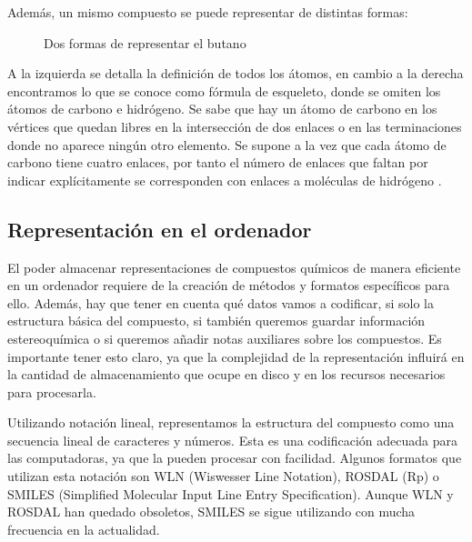 Además, un mismo compuesto se puede representar de distintas formas:
\begin{figure}[H]
\centering
    \caption{Dos formas de representar el butano} 
\end{figure}

A la izquierda se detalla la definición de todos los átomos, en cambio a la derecha encontramos lo que se conoce como fórmula de esqueleto, donde se omiten los átomos de carbono e hidrógeno. Se sabe que hay un átomo de carbono en los vértices que quedan libres en la intersección de dos enlaces o en las terminaciones donde no aparece ningún otro elemento. Se supone a la vez que cada átomo de carbono tiene cuatro enlaces, por tanto el número de enlaces que faltan por indicar explícitamente se corresponden con enlaces a moléculas de hidrógeno \cite{formestructural,structrep}.


\subsection{Representación en el ordenador}
El poder almacenar representaciones de compuestos químicos de manera eficiente en un ordenador requiere de la creación de métodos y formatos específicos para ello. Además, hay que tener en cuenta qué datos vamos a codificar, si solo la estructura básica del compuesto, si también queremos guardar información estereoquímica o si queremos añadir notas auxiliares sobre los compuestos. Es importante tener esto claro, ya que la complejidad de la representación influirá en la cantidad de almacenamiento que ocupe en disco y en los recursos necesarios para procesarla.

Utilizando notación lineal, representamos la estructura del compuesto como una secuencia lineal de caracteres y números. Esta es una codificación adecuada para las computadoras, ya que la pueden procesar con facilidad. Algunos formatos que utilizan esta notación son WLN (Wiswesser Line Notation), ROSDAL (Rp) o SMILES (Simplified Molecular Input Line Entry Specification). Aunque WLN y ROSDAL han quedado obsoletos, SMILES se sigue utilizando con mucha frecuencia en la actualidad. \cite{doi:10.1021/ci600234z}

